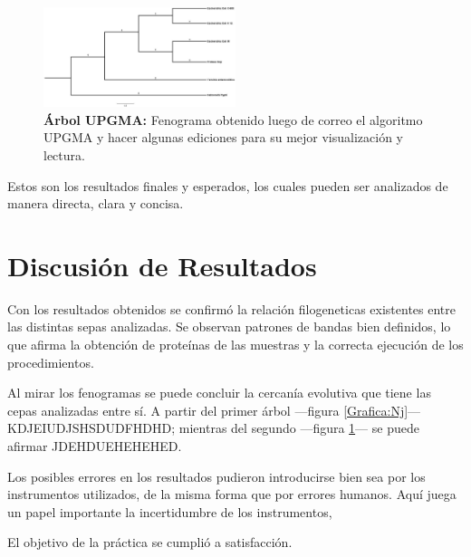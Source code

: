 \documentclass[%
 reprint,
 amsmath,amssymb,
 aps,
showkeys,
letter,
12pts
]{revtex4-1}
\begin{document}
		\begin{figure}[h!]
		\includegraphics[width=0.5\textwidth]{arbolUPGMA.jpg}
		\caption{\textbf{Árbol UPGMA:} Fenograma obtenido luego de correo el algoritmo UPGMA y hacer algunas ediciones para su mejor visualización y lectura.}
		\label{Grafica:UPGMA}
		\end{figure}	
		
		Estos son los resultados finales y esperados, los cuales pueden ser analizados de manera directa, clara y concisa.

\section{\label{sec:Dis}Discusión de Resultados}
	Con los resultados obtenidos se confirmó la relación filogeneticas existentes entre las distintas sepas analizadas. Se observan patrones de bandas bien definidos, lo que afirma la obtención de proteínas de las muestras y la correcta ejecución de los procedimientos.
	
	Al mirar los fenogramas se puede concluir la cercanía evolutiva que tiene las cepas analizadas entre sí. A partir del primer árbol ---figura \ref{Grafica:Nj}--- KDJEIUDJSHSDUDFHDHD; mientras del segundo ---figura \ref{Grafica:UPGMA}--- se puede afirmar JDEHDUEHEHEHED.
	
	Los posibles errores en los resultados pudieron introducirse bien sea por los instrumentos utilizados, de la misma forma que por errores humanos. Aquí juega un papel importante la incertidumbre de los instrumentos, 
	
	El objetivo de la práctica se cumplió a satisfacción.
	
	
	
	



\end{document}
